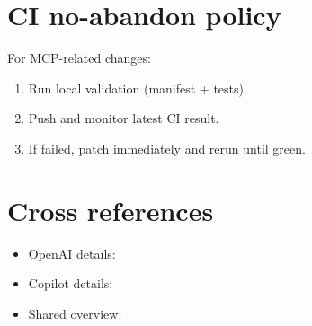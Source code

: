 \section{CI no-abandon policy}

For MCP-related changes:
\begin{enumerate}
  \item Run local validation (manifest + tests).
  \item Push and monitor latest CI result.
  \item If failed, patch immediately and rerun until green.
\end{enumerate}

\section{Cross references}

\begin{itemize}
  \item OpenAI details: 
  \item Copilot details: 
  \item Shared overview: 
\end{itemize}

